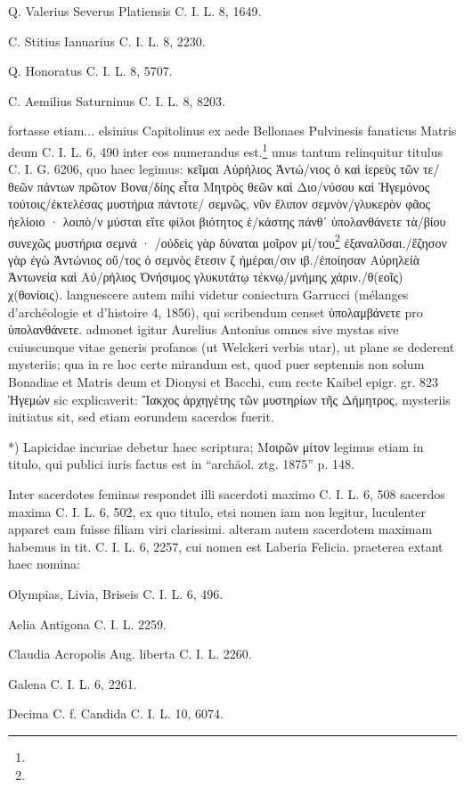 \documentclass[a4paper, 11pt, oneside, polutonikogreek, german]{article}
\begin{document}
Q. Valerius Severus Platiensis C. I. L. 8, 1649.

C. Stitius Ianuarius C. I. L. 8, 2230.

Q. Honoratus C. I. L. 8, 5707.

C. Aemilius Saturninus C. I. L. 8, 8203.

fortasse etiam... elsinius Capitolinus ex aede Bellonaes Pulvinesis fanaticus Matris deum C. I. L. 6, 490 inter eos numerandus est.\footnote{} unus tantum relinquitur titulus C. I. G. 6206, quo haec legimus: κεῖμαι Αὐρήλιος Ἀντώ/νιος ὁ καὶ ἱερεὺς τῶν τε/θεῶν πάντων πρῶτον Βονα/δίης εἶτα Μητρὸς θεῶν καὶ Διο/νύσου καὶ Ἡγεμόνος τούτοις/ἐκτελέσας μυστήρια πάντοτε/ σεμνῶς, νῦν ἔλιπον σεμνὸν/γλυκερὸν φᾶος ἠελίοιο · λοιπὸ/ν μύσται εἴτε φίλοι βιότητος ἑ/κάστης πάνθ᾽ ὑπολανθάνετε τὰ/βίου συνεχῶς μυστήρια σεμνά · /οὐδεὶς γὰρ δύναται μοῖρον μί/του\footnote{} ἐξαναλῦσαι./ἕζησον γὰρ ἐγὼ Ἀντώνιος οὔ/τος ὁ σεμνὸς ἕτεσιν ζ ἡμέραι/σιν ιβ./ἐποίησαν Αὐρηλείὰ Ἀντωνεία καὶ Αὐ/ρήλιος Ὀνήσιμος γλυκυτάτῳ τέκνῳ/μνήμης χάριν./θ(εοῖς) χ(θονίοις). languescere autem mihi videtur coniectura Garrucci (mélanges d'archéologie et d'histoire 4, 1856), qui scribendum censet ὑπολαμβάνετε pro ὑπολανθάνετε. admonet igitur Aurelius Antonius omnes sive mystas sive cuiuscunque vitae generis profanos (ut Welckeri verbis utar), ut plane se dederent mysteriis; qua in re hoc certe mirandum est, quod puer septennis non solum Bonadiae et Matris deum et Dionysi et Bacchi, cum recte Kaibel epigr. gr. 823 Ἡγεμών sic explicaverit: Ἴακχος ἀρχηγέτης τῶν μυστηρίων τῆς Δήμητρος, mysteriis initiatus sit, sed etiam eorundem sacerdos fuerit.

*) Lapicidae incuriae debetur haec scriptura; Μοιρῶν μίτον legimus etiam in titulo, qui publici iuris factus est in "`archäol. ztg. 1875"' p. 148.

Inter sacerdotes feminas respondet illi sacerdoti maximo C. I. L. 6, 508 sacerdos maxima C. I. L. 6, 502, ex quo titulo, etsi nomen iam non legitur, luculenter apparet eam fuisse filiam viri clarissimi. alteram autem sacerdotem maximam habemus in tit. C. I. L. 6, 2257, cui nomen est Laberia Felicia. praeterea extant haec nomina:

Olympias, Livia, Briseis C. I. L. 6, 496.

Aelia Antigona C. I. L. 2259.

Claudia Acropolis Aug. liberta C. I. L. 2260.

Galena C. I. L. 6, 2261.

Decima C. f. Candida C. I. L. 10, 6074.
\end{document}
